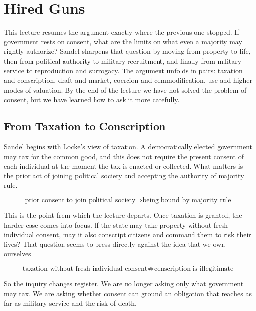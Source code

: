 \chapter{Hired Guns}

This lecture resumes the argument exactly where the previous one stopped. If government rests on consent, what are the limits on what even a majority may rightly authorize? Sandel sharpens that question by moving from property to life, then from political authority to military recruitment, and finally from military service to reproduction and surrogacy. The argument unfolds in pairs: taxation and conscription, draft and market, coercion and commodification, use and higher modes of valuation. By the end of the lecture we have not solved the problem of consent, but we have learned how to ask it more carefully.

\section{From Taxation to Conscription}

Sandel begins with Locke's view of taxation. A democratically elected government may tax for the common good, and this does not require the present consent of each individual at the moment the tax is enacted or collected. What matters is the prior act of joining political society and accepting the authority of majority rule.

\begin{equation}
\text{prior consent to join political society} \Longrightarrow \text{being bound by majority rule}
\end{equation}

This is the point from which the lecture departs. Once taxation is granted, the harder case comes into focus. If the state may take property without fresh individual consent, may it also conscript citizens and command them to risk their lives? That question seems to press directly against the idea that we own ourselves.

\begin{equation}
\text{taxation without fresh individual consent} \not\Rightarrow \text{conscription is illegitimate}
\end{equation}

So the inquiry changes register. We are no longer asking only what government may tax. We are asking whether consent can ground an obligation that reaches as far as military service and the risk of death.

